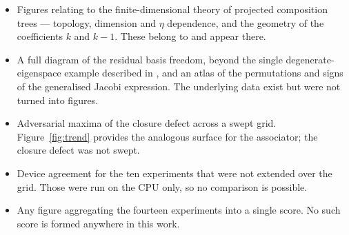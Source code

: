 \documentclass[11pt]{amsart}
\begin{document}
\begin{itemize}[leftmargin=*]
\item Figures relating to the finite-dimensional theory of projected composition trees
--- topology, dimension and $\eta$ dependence, and the geometry of the coefficients $k$ and
$k-1$. These belong to \cite{ChaveroJassoTrees} and appear there.
\item A full diagram of the residual basis freedom, beyond the single degenerate-eigenspace
example described in \cite{ChaveroJassoNumerical}, and an atlas of the permutations and
signs of the generalised Jacobi expression. The underlying data exist but were not turned
into figures.
\item Adversarial maxima of the closure defect across a swept grid. Figure~\ref{fig:trend}
provides the analogous surface for the associator; the closure defect was not swept.
\item Device agreement for the ten experiments that were not extended over the grid. Those
were run on the CPU only, so no comparison is possible.
\item Any figure aggregating the fourteen experiments into a single score. No such score is
formed anywhere in this work.
\end{itemize}



\end{document}

